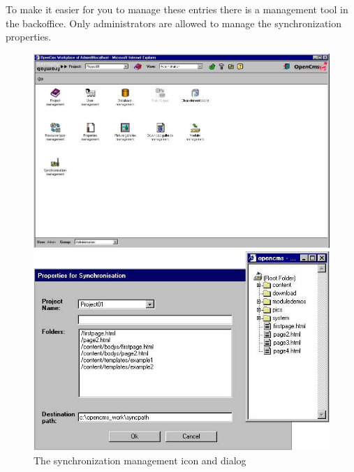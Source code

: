 To make it easier for you to manage these entries there is a
management tool in the backoffice. Only administrators are allowed
to manage the synchronization properties.

\begin{figure}[hbt]

\begin{minipage}[b]{0.499\linewidth}
  \begin{center}
  \includegraphics[clip,width=\sgw]
                   {pics/synchronize/syncprop01}
 \end{center}
\end{minipage}
\hfill
\begin{minipage}[b]{0.499\linewidth}
   \begin{center}
   \includegraphics[clip,width=\sgw]
                   {pics/synchronize/syncprop02}
   \end{center}
\end{minipage}
\caption[The synchronization management icon and dialog]
           {The synchronization management icon and dialog}
 \label{syncproperties}

\end{figure}


